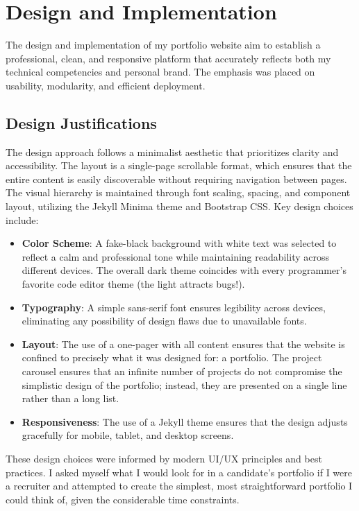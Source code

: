 \chapter{Design and Implementation}
The design and implementation of my portfolio website aim to establish a professional, clean, and responsive platform that accurately reflects both my technical competencies and personal brand. The emphasis was placed on usability, modularity, and efficient deployment.

\section{Design Justifications}
The design approach follows a minimalist aesthetic that prioritizes clarity and accessibility. The layout is a single-page scrollable format, which ensures that the entire content is easily discoverable without requiring navigation between pages. The visual hierarchy is maintained through font scaling, spacing, and component layout, utilizing the Jekyll Minima theme and Bootstrap CSS. Key design choices include:
\begin{itemize}
	\item \textbf{Color Scheme}: A fake-black background with white text was selected to reflect a calm and professional tone while maintaining readability across different devices. The overall dark theme coincides with every programmer’s favorite code editor theme (the light attracts bugs!).
	\item \textbf{Typography}: A simple sans-serif font ensures legibility across devices, eliminating any possibility of design flaws due to unavailable fonts.
	\item \textbf{Layout}: The use of a one-pager with all content ensures that the website is confined to precisely what it was designed for: a portfolio. The project carousel ensures that an infinite number of projects do not compromise the simplistic design of the portfolio; instead, they are presented on a single line rather than a long list.
	\item \textbf{Responsiveness}: The use of a Jekyll theme ensures that the design adjusts gracefully for mobile, tablet, and desktop screens.
\end{itemize}

These design choices were informed by modern UI/UX principles and best practices. I asked myself what I would look for in a candidate’s portfolio if I were a recruiter and attempted to create the simplest, most straightforward portfolio I could think of, given the considerable time constraints.

